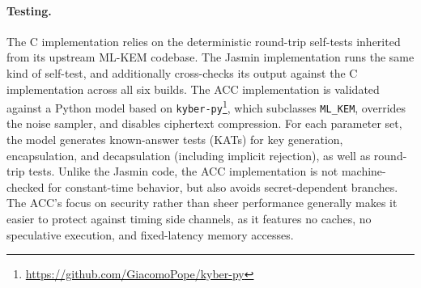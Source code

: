 \paragraph{Testing.}
The C implementation relies on the deterministic round-trip self-tests
inherited from its upstream ML-KEM codebase. The Jasmin implementation runs
the same kind of self-test, and additionally cross-checks its output against
the C implementation across all six builds. The ACC
implementation is validated against a Python model based on
\texttt{kyber-py}\footnote{\url{https://github.com/GiacomoPope/kyber-py}}, which subclasses \texttt{ML\_KEM}, overrides the noise sampler, and
disables ciphertext compression. For each parameter set, the model generates
known-answer tests (KATs) for key generation, encapsulation, and decapsulation
(including implicit rejection), as well as round-trip tests.
Unlike the Jasmin code, the ACC implementation is not machine-checked for constant-time behavior, 
but also avoids secret-dependent branches.
The ACC's focus on security rather than sheer performance 
generally makes it easier to protect against timing side channels, 
as it features 
no caches, 
no speculative execution, 
and fixed-latency memory accesses.

